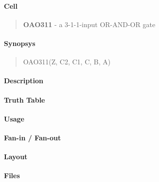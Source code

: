 \label{OAO311}
\paragraph{Cell}
\begin{quote}
    \textbf{OAO311} - a 3-1-1-input OR-AND-OR gate
\end{quote}

\paragraph{Synopsys}
\begin{quote}
    OAO311(Z, C2, C1, C, B, A)
\end{quote}

\paragraph{Description}

%

\paragraph{Truth Table}
%

\paragraph{Usage}

\paragraph{Fan-in / Fan-out}

\paragraph{Layout}

\paragraph{Files}
